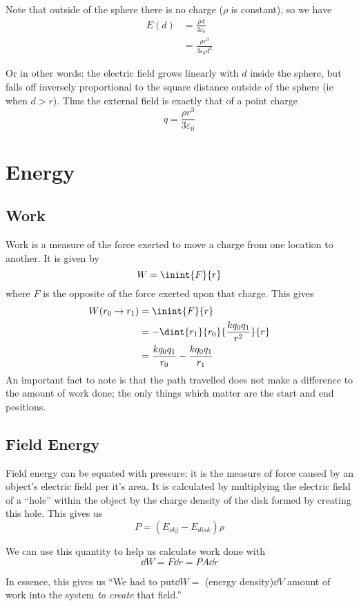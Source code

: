 \documentclass[12pt]{article}
\begin{document}
Note that outside of the sphere there is no charge ($\rho$ is constant), so we have
\begin{align*}
E(d) &= \frac{\rho d}{3\varepsilon_0} \\
     &= \frac{\rho r^3}{3\varepsilon_0 d^2}
\end{align*}

Or in other words: the electric field grows linearly with $d$ inside the sphere, but falls off inversely proportional to the square distance outside of the sphere (ie when $d > r$). Thus the external field is exactly that of a point charge \[ q = \frac{\rho r^3}{3\varepsilon_0} \]

\section*{Energy}
\subsection*{Work}
Work is a measure of the force exerted to move a charge from one location to another. It is given by \[ W = \inint{F}{r} \] where $F$ is the opposite of the force exerted upon that charge. This gives
\begin{align*}
W(r_0 \to r_1) &= \inint{F}{r}\\
               &= - \dint{r_1}{r_0}{\frac{kq_0q_1}{r^2}}{r}\\
               &= \frac{kq_0q_1}{r_0} - \frac{kq_0q_1}{r_1}
\end{align*}
An important fact to note is that the path travelled does not make a difference to the amount of work done; the only things which matter are the start and end positions.

\subsection*{Field Energy}
Field energy can be equated with pressure: it is the measure of force caused by an object's electric field per it's area. It is calculated by multiplying the electric field of a ``hole'' within the object by the charge density of the disk formed by creating this hole. This gives us \[ P = (E_{obj} - E_{disk})\rho \]

We can use this quantity to help us calculate work done with \[ \dd W = F \dd r = PA \dd r \]

In essence, this gives us ``We had to put$\dd W = $ (energy density)$\dd V$ amount of work into the system \emph{to create} that field.''
\end{document}
